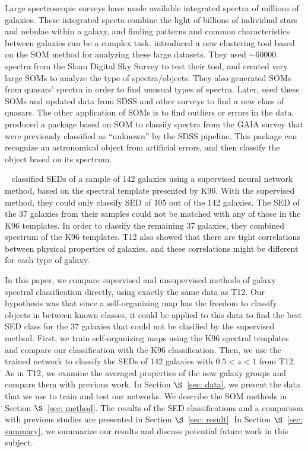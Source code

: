 Large spectroscopic surveys have made available integrated spectra of millions of galaxies.
These integrated specta combine the light of billions of individual stars and nebulae within a galaxy, and
finding patterns and common characteristics between galaxies can be a complex task.
\citet{In12} introduced a new clustering tool based on the SOM method for analyzing these large datasets.
They used $\sim 60000$ spectra from the Sloan Digital Sky Survey \citep[SDSS;][]{Abazajian09} to test their tool, and created very large SOMs to analyze the type of spectra/objects.
They also generated SOMs from quasars' spectra in order to find unusual types of spectra. 
Later, \citet{Meusinger16} used these SOMs and updated data from SDSS and other surveys to find a new class of quasars.
The other application of SOMs is to find outliers or errors in the data.
\citet{Fustes13} produced a package based on SOM to classify spectra from the GAIA survey that were previously classified as ``unknown'' by the SDSS pipeline. This package can recognize an astronomical object from artificial errors, and then classify the object based on its spectrum. %

~\citet[][hereafter T12]{Hossein12} classified SEDs of a sample of 142 galaxies using a supervised neural network method, based on the spectral template presented by K96.
With the supervised method, they could only classify SED of 105 out of the 142 galaxies.
The SED of the 37 galaxies from their samples could not be matched with any of those in the K96 templates. 
In order to classify the remaining 37 galaxies, they combined spectrum of the K96 templates.
T12 also showed that there are tight correlations between physical properties of galaxies, and these correlations might be different for each type of galaxy.

In this paper, we compare supervised and unsupervised methods of galaxy spectral classification directly, using exactly the same data as T12.  
Our hypothesis was that since a self-organizing map has the freedom to classify objects in between known classes, it could be applied to this data 
to find the best SED class for the 37 galaxies that could not be clasified by the supervised method.
First, we train self-organizing maps using the K96 spectral templates and compare our classification with the K96 classification.
Then, we use the trained network to classify the SEDs of 142 galaxies with $0.5 < z < 1$ from T12. 
As in T12, we examine the averaged properties of the new galaxy groups and compare them with previous work.
In Section $\S$~\ref{sec: data}, we present the data that we use to train and test our networks. 
We describe the SOM methods in Section $\S$~\ref{sec: method}. 
The results of the SED classifications and a comparison with previous studies are presented in Section $\S$~\ref{sec: result}. 
In Section $\S$~\ref{sec: summary}, we summarize our results and discuss potential future work in this subject.
